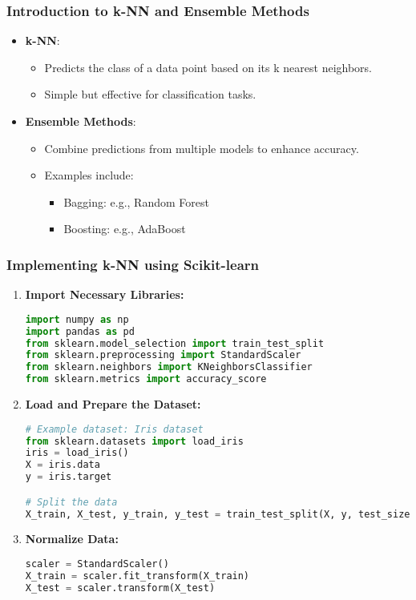 \documentclass[aspectratio=169]{beamer}
\begin{document}
\begin{frame}
    \frametitle{Introduction to k-NN and Ensemble Methods}
    \begin{itemize}
        \item \textbf{k-NN}:
        \begin{itemize}
            \item Predicts the class of a data point based on its k nearest neighbors.
            \item Simple but effective for classification tasks.
        \end{itemize}
        \item \textbf{Ensemble Methods}:
        \begin{itemize}
            \item Combine predictions from multiple models to enhance accuracy.
            \item Examples include:
            \begin{itemize}
                \item Bagging: e.g., Random Forest
                \item Boosting: e.g., AdaBoost
            \end{itemize}
        \end{itemize}
    \end{itemize}
\end{frame}

\begin{frame}[fragile]
    \frametitle{Implementing k-NN using Scikit-learn}
    \begin{enumerate}
        \item \textbf{Import Necessary Libraries:}
        \begin{lstlisting}[language=Python]
import numpy as np
import pandas as pd
from sklearn.model_selection import train_test_split
from sklearn.preprocessing import StandardScaler
from sklearn.neighbors import KNeighborsClassifier
from sklearn.metrics import accuracy_score
        \end{lstlisting}

        \item \textbf{Load and Prepare the Dataset:}
        \begin{lstlisting}[language=Python]
# Example dataset: Iris dataset
from sklearn.datasets import load_iris
iris = load_iris()
X = iris.data
y = iris.target

# Split the data
X_train, X_test, y_train, y_test = train_test_split(X, y, test_size=0.2, random_state=42)
        \end{lstlisting}

        \item \textbf{Normalize Data:}
        \begin{lstlisting}[language=Python]
scaler = StandardScaler()
X_train = scaler.fit_transform(X_train)
X_test = scaler.transform(X_test)
        \end{lstlisting}
    \end{enumerate}
\end{frame}
\end{document}

